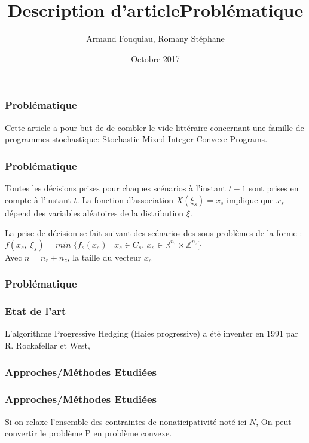 \documentclass[10pt]{beamer}
\title{Description d'article}
\author{Armand Fouquiau, Romany Stéphane}
\institute{Université Paris-Sud}
\date{Octobre 2017}
\newcommand{\reels}{\mathbb{R}}
\newcommand{\integers}{\mathbb{Z}}
\begin{document}
    \begin{frame}
    \titlepage
    \end{frame}

    
        \begin{frame}
        \frametitle{Problématique}
        Cette article a pour but de de combler le vide littéraire concernant une famille de programmes stochastique: Stochastic Mixed-Integer Convexe Programs.
    \end{frame}
        
    \begin{frame}
        \frametitle{Problématique}
        Toutes les décisions prises pour chaques scénarios à l'instant $t-1$ sont prises en compte à l'instant $t$. La fonction d'association $X(\xi_s) = x_s$ implique que $x_s$ dépend des variables aléatoires de la distribution $\xi$.
    \end{frame}
    
    
    \begin{frame}
        \title{Problématique}
        La prise de décision se fait suivant des scénarios des sous problèmes de la forme : 
         $f(x_s, \;\xi_{s}) = min \;\{f_s(x_s) \; | \; x_s \in C_s, \,x_s \in \reels^{n_r} \times \integers^{n_z}\}$\\
         Avec $n = n_r + n_z$, la taille du vecteur $x_s$
    \end{frame}
    
    
    \begin{frame}
        \frametitle{Problématique}
                
    \end{frame}
        
    \begin{frame}
        \frametitle{Etat de l'art}
        L'algorithme Progressive Hedging (Haies progressive) a été inventer en 1991 par R. Rockafellar et West, 
    \end{frame}
        
    \begin{frame}
        \frametitle{Approches/Méthodes Etudiées}
    \end{frame}
    
    \begin{frame}
        \frametitle{Approches/Méthodes Etudiées}
        Si on relaxe l'ensemble des contraintes de nonaticipativité noté ici $N$, On peut convertir le problème P en problème convexe.
    \end{frame}
    
\end{document}
